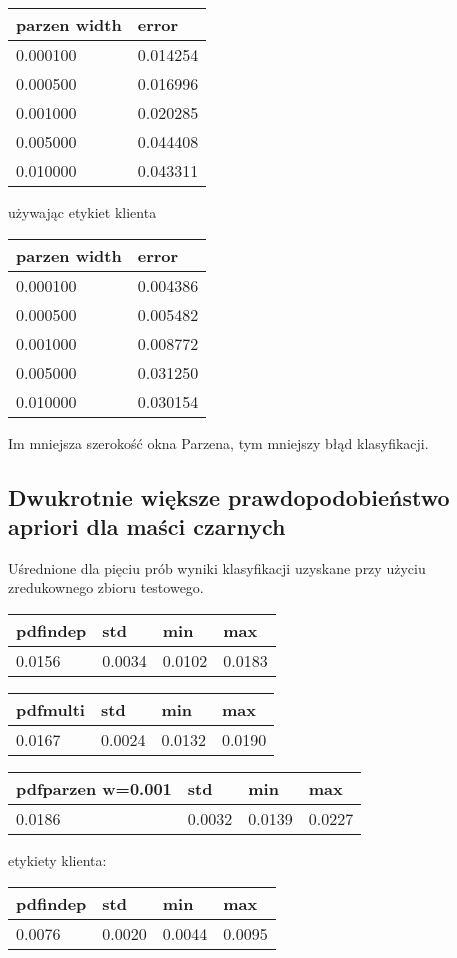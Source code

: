 \documentclass[11pt]{article}
\begin{document}
\begin{longtable}[]{@{}ll@{}}
\toprule
parzen width & error\tabularnewline
\midrule
\endhead
0.000100 & 0.014254\tabularnewline
0.000500 & 0.016996\tabularnewline
0.001000 & 0.020285\tabularnewline
0.005000 & 0.044408\tabularnewline
0.010000 & 0.043311\tabularnewline
\bottomrule
\end{longtable}

używając etykiet klienta

\begin{longtable}[]{@{}ll@{}}
\toprule
parzen width & error\tabularnewline
\midrule
\endhead
0.000100 & 0.004386\tabularnewline
0.000500 & 0.005482\tabularnewline
0.001000 & 0.008772\tabularnewline
0.005000 & 0.031250\tabularnewline
0.010000 & 0.030154\tabularnewline
\bottomrule
\end{longtable}

Im mniejsza szerokość okna Parzena, tym mniejszy błąd klasyfikacji.

\subsection{Dwukrotnie większe prawdopodobieństwo apriori dla maści
czarnych}\label{dwukrotnie-wiux119ksze-prawdopodobieux144stwo-apriori-dla-maux15bci-czarnych}

Uśrednione dla pięciu prób wyniki klasyfikacji uzyskane przy użyciu
zredukownego zbioru testowego.

\begin{longtable}[]{@{}llll@{}}
\toprule
pdfindep & std & min & max\tabularnewline
\midrule
\endhead
0.0156 & 0.0034 & 0.0102 & 0.0183\tabularnewline
\bottomrule
\end{longtable}

\begin{longtable}[]{@{}llll@{}}
\toprule
pdfmulti & std & min & max\tabularnewline
\midrule
\endhead
0.0167 & 0.0024 & 0.0132 & 0.0190\tabularnewline
\bottomrule
\end{longtable}

\begin{longtable}[]{@{}llll@{}}
\toprule
pdfparzen w=0.001 & std & min & max\tabularnewline
\midrule
\endhead
0.0186 & 0.0032 & 0.0139 & 0.0227\tabularnewline
\bottomrule
\end{longtable}

etykiety klienta:

\begin{longtable}[]{@{}llll@{}}
\toprule
pdfindep & std & min & max\tabularnewline
\midrule
\endhead
0.0076 & 0.0020 & 0.0044 & 0.0095\tabularnewline
\bottomrule
\end{longtable}
\end{document}
